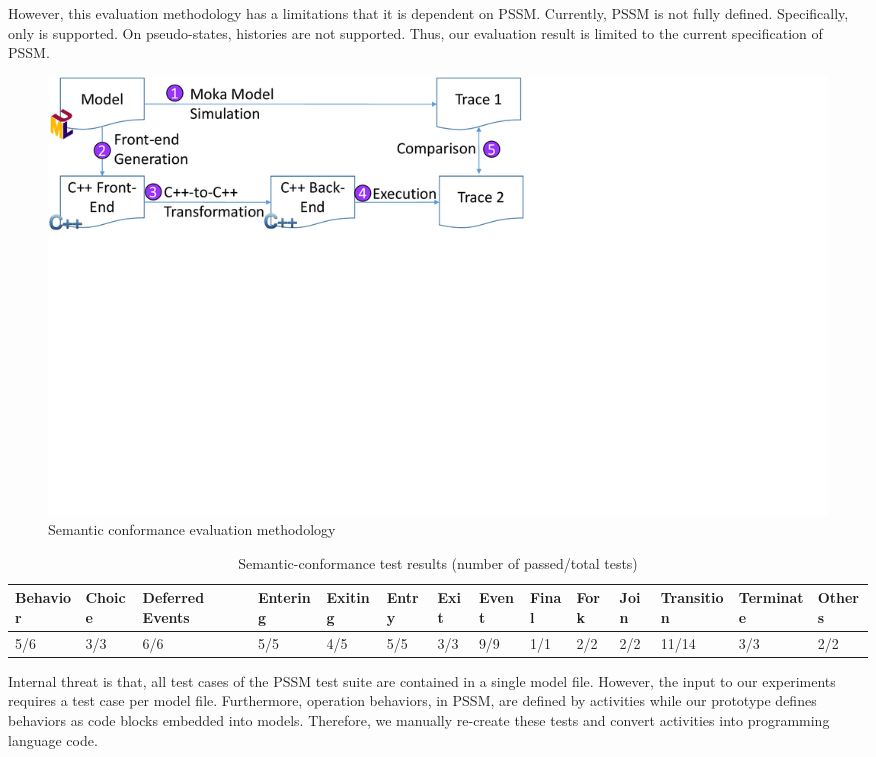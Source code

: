 However, this evaluation methodology has a limitations that it is dependent on PSSM.
Currently, PSSM is not fully defined.
Specifically, only  is supported.
On pseudo-states, histories are not supported.
Thus, our evaluation result is limited to the current specification of PSSM.

\begin{figure}
	\centering
	\includegraphics[clip, trim=0cm 12.0cm 12.7cm 0cm, width=\columnwidth]{figures/semanticconformance.pdf}
	\caption{Semantic conformance evaluation methodology} 
	\label{fig:semanticconformance}
\end{figure}		


\begin{table}[]
	\centering
	\caption{Semantic-conformance test results (number of passed/total tests)}
	\label{table:semantic-test}
	\begin{tabular}{|l|l|l|l|l|l|l|l|l|l|l|l|l|l|}
		\hline
		Behavior & Choice & Deferred Events & Entering & Exiting & Entry & Exit & Event & Final & Fork & Join & Transition & Terminate & Others \\ \hline
		5/6&        3/3&         6/6        &    5/5      &    4/5     &  5/5     &   3/3   &    9/9    &   1/1    &   2/2   &   2/2   &      11/14      &    3/3       &    2/2    \\ \hline
	\end{tabular}
\end{table}

{}
Internal threat is that, all test cases of the PSSM test suite are contained in a single model file.
However, the input to our experiments requires a test case per model file.
Furthermore, operation behaviors, in PSSM, are defined by activities while our prototype defines behaviors as code blocks embedded into models.
Therefore, we manually re-create these tests and convert activities into programming language code.

